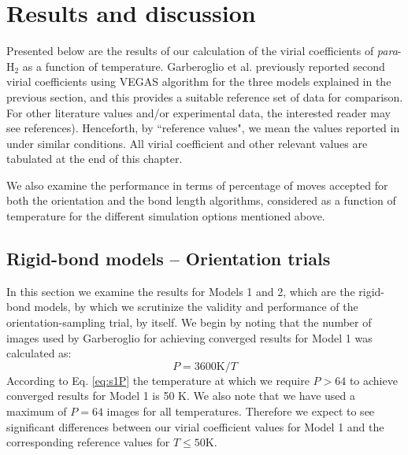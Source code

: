     \section{Results and discussion}
    \label{sec:Results and discussion}
        Presented below are the results of our calculation of the virial coefficients of \emph{para}-H$_2$ as a function of temperature. Garberoglio et al.\cite{Garberoglio2014} previously reported second virial coefficients using VEGAS\cite{Lepage1972} algorithm for the three models explained in the previous section, and this provides a suitable reference set of data for comparison. For other literature values and/or experimental data, the interested reader may see references\cite{Goodwin1963, Patkowski2008, Leachman2009, Sakoda2012, Garberoglio2012, Garberoglio2014}). Henceforth, by ``reference values", we mean the values reported in \cite{Garberoglio2014} under similar conditions. All virial coefficient and other relevant values are tabulated at the end of this chapter.

        We also examine the performance in terms of percentage of moves accepted for both the orientation and the bond length algorithms, considered as a function of temperature for the different simulation options mentioned above.

        \subsection{Rigid-bond models -- Orientation trials}
            In this section we examine the results for Models 1 and 2, which are the rigid-bond models, by which we scrutinize the validity and performance of the orientation-sampling trial, by itself. We begin by noting that the number of images used by Garberoglio for achieving converged results \cite{Patkowski2008} for Model 1 was calculated as:
            \begin{equation}
            \label{eq:s1P}
                P = 3600 \textrm{K}/T
            \end{equation}
According to Eq. \eqref{eq:s1P} the temperature at which we require $P > 64$ to achieve converged results for Model 1 is 50 K. We also note that we have used a maximum of $P = 64$ images for all temperatures. Therefore we expect to see significant differences between our virial coefficient values for Model 1 and the corresponding reference values for $T \le 50 $K.

